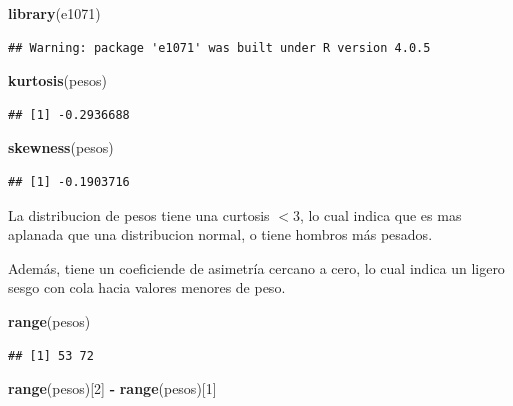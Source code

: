 \documentclass[twocolumn]{article}
\newenvironment{Shaded}{\begin{snugshade}}{\end{snugshade}}
\newcommand{\KeywordTok}[1]{\textcolor[rgb]{0.13,0.29,0.53}{\textbf{#1}}}
\newcommand{\DecValTok}[1]{\textcolor[rgb]{0.00,0.00,0.81}{#1}}
\newcommand{\StringTok}[1]{\textcolor[rgb]{0.31,0.60,0.02}{#1}}
\newcommand{\OperatorTok}[1]{\textcolor[rgb]{0.81,0.36,0.00}{\textbf{#1}}}
\newcommand{\NormalTok}[1]{#1}
\begin{document}
\begin{Shaded}
\begin{Highlighting}[]
\KeywordTok{library}\NormalTok{(e1071)}
\end{Highlighting}
\end{Shaded}

\begin{verbatim}
## Warning: package 'e1071' was built under R version 4.0.5
\end{verbatim}

\begin{Shaded}
\begin{Highlighting}[]
\KeywordTok{kurtosis}\NormalTok{(pesos)}
\end{Highlighting}
\end{Shaded}

\begin{verbatim}
## [1] -0.2936688
\end{verbatim}

\begin{Shaded}
\begin{Highlighting}[]
\KeywordTok{skewness}\NormalTok{(pesos)}
\end{Highlighting}
\end{Shaded}

\begin{verbatim}
## [1] -0.1903716
\end{verbatim}

La distribucion de pesos tiene una curtosis \(<3\), lo cual indica que
es mas aplanada que una distribucion normal, o tiene hombros más
pesados.

Además, tiene un coeficiende de asimetría cercano a cero, lo cual indica
un ligero sesgo con cola hacia valores menores de peso.

\begin{Shaded}
\begin{Highlighting}[]
\KeywordTok{range}\NormalTok{(pesos)}
\end{Highlighting}
\end{Shaded}

\begin{verbatim}
## [1] 53 72
\end{verbatim}

\begin{Shaded}
\begin{Highlighting}[]
\KeywordTok{range}\NormalTok{(pesos)[}\DecValTok{2}\NormalTok{] }\OperatorTok{-}\StringTok{ }\KeywordTok{range}\NormalTok{(pesos)[}\DecValTok{1}\NormalTok{]}
\end{Highlighting}
\end{Shaded}
\end{document}
